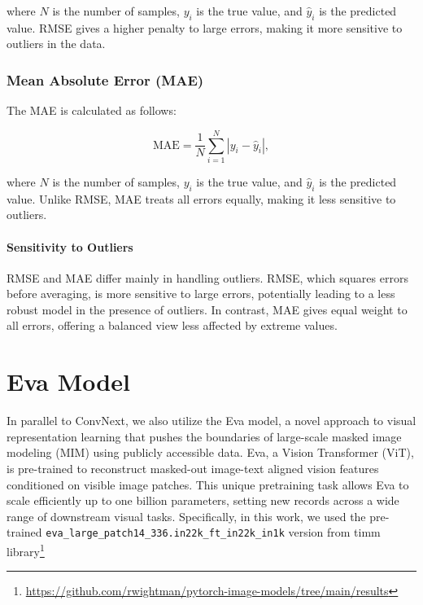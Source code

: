 \documentclass[a4paper,12pt,openright]{book}
\begin{document}
where \(N\) is the number of samples, \(y_{i}\) is the true value, and \(\hat{y}_{i}\) is the predicted value. RMSE gives a higher penalty to large errors, making it more sensitive to outliers in the data.

\subsubsection{Mean Absolute Error (MAE)}

The MAE is calculated as follows:

\begin{equation}
\text{MAE} = \frac{1}{N} \sum_{i=1}^{N} |y_{i} - \hat{y}_{i}|,
\end{equation}

where \(N\) is the number of samples, \(y_{i}\) is the true value, and \(\hat{y}_{i}\) is the predicted value. Unlike RMSE, MAE treats all errors equally, making it less sensitive to outliers.

\paragraph{Sensitivity to Outliers}

RMSE and MAE differ mainly in handling outliers. RMSE, which squares errors before averaging, is more sensitive to large errors, potentially leading to a less robust model in the presence of outliers. In contrast, MAE gives equal weight to all errors, offering a balanced view less affected by extreme values.



\newpage
\section{Eva Model}
\label{sec:eva}

In parallel to ConvNext, we also utilize the Eva model, a novel approach to visual representation learning that pushes the boundaries of large-scale masked image modeling (MIM) using publicly accessible data. Eva, a Vision Transformer (ViT), is pre-trained to reconstruct masked-out image-text aligned vision features conditioned on visible image patches. This unique pretraining task allows Eva to scale efficiently up to one billion parameters, setting new records across a wide range of downstream visual tasks. Specifically, in this work, we used the pre-trained \texttt{eva\_large\_patch14\_336.in22k\_ft\_in22k\_in1k} 
version from timm library\footnote{\label{timm}\url{https://github.com/rwightman/pytorch-image-models/tree/main/results}}
\end{document}
